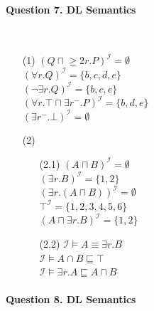 \documentclass[12pt]{article}
\begin{document}
    \paragraph{Question 7. DL Semantics}~{}
    \\

    \begin{enumerate}
        \item[(1)]
        $(Q \sqcap {\ge 2r.P})^{\mathcal{I}} = \emptyset$ \\
        $(\forall r.Q)^{\mathcal{I}} = \{ b, c, d, e \}$ \\
        $(\lnot \exists r.Q)^{\mathcal{I}} = \{ b, c, e \}$ \\
        $(\forall r.\top \sqcap \exists r^{-}.P)^{\mathcal{I}} = \{ b, d, e \}$ \\
        $(\exists r^{-}.\bot)^{\mathcal{I}} = \emptyset$
        \item[(2)]
        \begin{enumerate}
            \item[(2.1)] 
            $(A \sqcap B)^{\mathcal{I}} = \emptyset$ \\
            $(\exists r.B)^{\mathcal{I}} = \{ 1, 2 \}$ \\
            $(\exists r.(A \sqcap B))^{\mathcal{I}} = \emptyset$ \\
            $\top^{\mathcal{I}} = \{ 1, 2, 3, 4, 5, 6 \}$ \\
            $(A \sqcap \exists r.B)^{\mathcal{I}} = \{ 1, 2 \}$ \\
            \item[(2.2)]
            $\mathcal{I} \models A \equiv \exists r.B$ \\
            $\mathcal{I} \models A \cap B \sqsubseteq \top$ \\
            $\mathcal{I} \models \exists r.A \sqsubseteq A \sqcap B$ \\
        \end{enumerate}
    \end{enumerate}

    \paragraph{Question 8. DL Semantics}~{}
    \\
\end{document}
